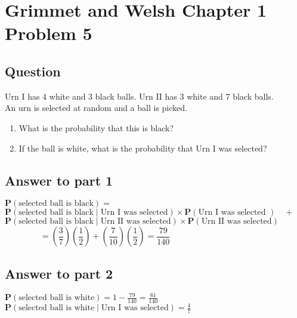 \section{Grimmet and Welsh Chapter 1 Problem 5}
\subsection{Question}


Urn I has 4 white and 3 black balls. Urn II has 3 white and 7 black balls.\\
An urn is selected at random and a ball is picked.\\
\begin{enumerate}
\item What is the probability that this is black?
\item If the ball is white, what is the probability that Urn I was selected?
\end{enumerate}

\subsection{Answer to part 1}
$\mathbf{P}(\text{selected ball is black})  = $ \\ 
$ \mathbf{P}(\text{selected ball is black} \mid \text{Urn I was selected})\times  \mathbf{P}(\text{Urn I was selected })  \quad +  $ \\
$ \mathbf{P}(\text{selected ball is black} \mid \text{Urn II was selected})\times  \mathbf{P}(\text{Urn II was selected}) $ \\               
  
\begin{equation*} 
= \left(\frac{3}{7}\right)\left(\frac{1}{2}\right) + \left(\frac{7}{10}\right) \left(\frac{1}{2}\right) = \frac{79}{140}   \qquad\qquad\qquad\qquad\qquad\qquad
\end{equation*} 


\subsection{Answer to part 2}
$\mathbf{P}(\text{selected ball is white})  = 1 - \frac{79}{140} = \frac{61}{140} $ \\ 
$\mathbf{P}(\text{selected ball is white} \mid \text{Urn I was selected}) = \frac{4}{7} $ \\ 
 
